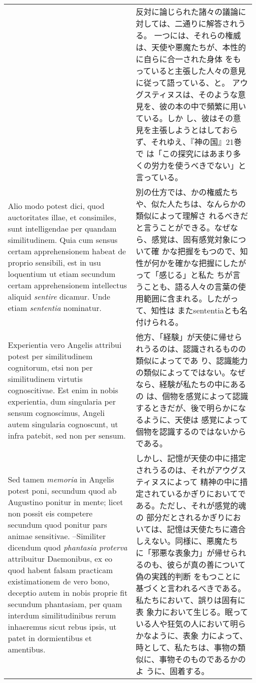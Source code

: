 \documentclass[10pt]{jsarticle} %
\begin{document}
\begin{longtable}{p{21em}p{21em}}
&

反対に論じられた諸々の議論に対しては、二通りに解答されうる。
一つには、それらの権威は、天使や悪魔たちが、本性的に自らに合一された身体
 をもっていると主張した人々の意見に従って語っている、と。
アウグスティヌスは、そのような意見を、彼の本の中で頻繁に用いている。しか
 し、彼はその意見を主張しようとはしておらず、それゆえ、『神の国』21巻で
 は「この探究にはあまり多くの労力を使うべきでない」と言っている。


\\



Alio modo potest dici, quod auctoritates illae, et
consimiles, sunt intelligendae per quandam similitudinem. Quia cum
sensus certam apprehensionem habeat de proprio sensibili, est in usu
loquentium ut etiam secundum certam apprehensionem intellectus aliquid
{\itshape sentire} dicamur. Unde etiam {\itshape sententia} nominatur. 

&

別の仕方では、かの権威たちや、似た人たちは、なんらかの類似によって理解さ
 れるべきだと言うことができる。なぜなら、感覚は、固有感覚対象について確
 かな把握をもつので、知性が何かを確かな把握にしたがって「感じる」と私た
 ちが言うことも、語る人々の言葉の使用範囲に含まれる。したがって、知性は
 またsententiaとも名付けられる。

\\
Experientia vero
Angelis attribui potest per similitudinem cognitorum, etsi non per
similitudinem virtutis cognoscitivae. 
Est enim in nobis experientia, dum
singularia per sensum cognoscimus, Angeli autem singularia cognoscunt,
ut infra patebit, sed non per sensum. 

&
他方、「経験」が天使に帰せられうるのは、認識されるものの類似によってであ
 り、認識能力の類似によってではない。なぜなら、経験が私たちの中にあるの
 は、個物を感覚によって認識するときだが、後で明らかになるように、天使は
 感覚によって個物を認識するのではないからである。


\\

Sed tamen {\itshape memoria} in Angelis
potest poni, secundum quod ab Augustino ponitur in mente; licet non
possit eis competere secundum quod ponitur pars animae
sensitivae. --Similiter dicendum quod {\itshape phantasia proterva} attribuitur
Daemonibus, ex eo quod habent falsam practicam existimationem de vero
bono, deceptio autem in nobis proprie fit secundum phantasiam, per quam
interdum similitudinibus rerum inhaeremus sicut rebus ipsis, ut patet in
dormientibus et amentibus.

&

しかし、記憶が天使の中に措定されうるのは、それがアウグスティヌスによって
 精神の中に措定されているかぎりにおいてである。ただし、それが感覚的魂の
 部分だとされるかぎりにおいては、記憶は天使たちに適合しえない。同様に、悪魔たち
 に「邪悪な表象力」が帰せられるのも、彼らが真の善について偽の実践的判断
 をもつことに基づくと言われるべきである。私たちにおいて、誤りは固有に表
 象力において生じる。眠っている人や狂気の人において明らかなように、表象
 力によって、時として、私たちは、事物の類似に、事物そのものであるかのよ
 うに、固着する。



\end{longtable}
\end{document}
